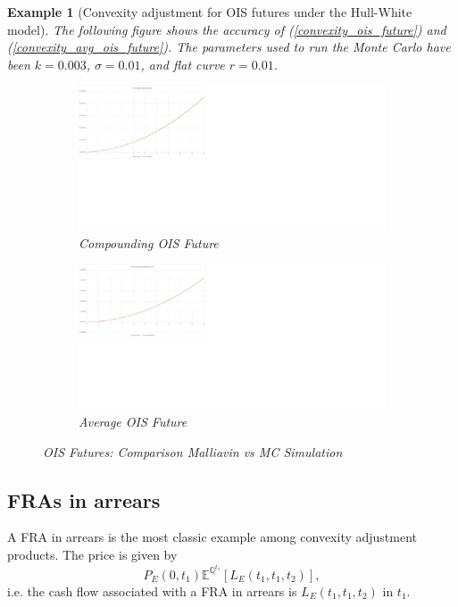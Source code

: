 \documentclass[a4paper,10pt]{article}
\newtheorem{example}[theorem]{Example}
\newcommand{\1}{\mathbf{1}}
\begin{document}
\begin{example}[Convexity adjustment for OIS futures under the Hull-White model]
The following figure shows the accuracy of (\ref{convexity_ois_future}) and (\ref{convexity_avg_ois_future}). The parameters used to run the Monte Carlo have been $k=0.003$, $\sigma=0.01$, and flat curve $r=0.01$. 
\begin{figure}[H]
\begin{subfigure}{.5\textwidth}
  \centering
  \includegraphics[scale=0.2]{Figures/convexity_ois.jpg}
		\caption{Compounding OIS Future}
\end{subfigure}
\begin{subfigure}{.5\textwidth}
  \centering
  \includegraphics[scale=0.2]{Figures/convexity_avg_ois.jpg}
		\caption{Average OIS Future}
\end{subfigure}
\caption{OIS Futures: Comparison Malliavin vs MC Simulation}
\end{figure} 
\end{example}



\subsection{FRAs in arrears}
A FRA in arrears is the most classic example among convexity adjustment products. The price is given by
\begin{equation}\label{FRAinArrear}
P_{E}(0,t_1)\mathbb{E}^{\mathbb{Q}^{t_1}}\left[L_{E}(t_1,t_1,t_2)\right],
\end{equation}
i.e. the cash flow associated with a FRA in arrears is $L_{E}(t_1,t_1,t_2)$ in $t_1$.
\end{document}
